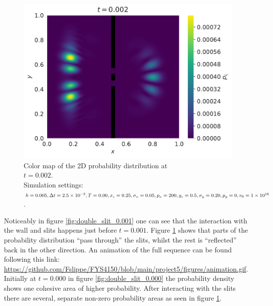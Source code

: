 \documentclass[english,notitlepage,reprint,nofootinbib]{revtex4-1}  %
\begin{document}
\begin{figure}[H]
    \centering
    \includegraphics[width=.5\textwidth]{../figures/double_slit_0.002.pdf}
    \caption{Color map of the 2D probability distribution at \\$t = 0.002$. \\Simulation settings: $h = 0.005, \Delta t = 2.5 \times 10^{-5}, \\T = 0.00, x_c = 0.25, \sigma_x = 0.05, p_x = 200, y_c = 0.5, \\\sigma_y = 0.20, p_y = 0, v_0 = 1 \times 10^{10}$.}
    \label{fig:double_slit_0.002}
\end{figure}
Noticeably in figure \ref{fig:double_slit_0.001} one can see that the interaction with the  wall and slits happens just before $t=0.001$. Figure \ref{fig:double_slit_0.002} shows that parts of the probability distribution ``pass through'' the slits, whilst the rest is ``reflected'' back in the other direction. An animation of the full sequence can be found following this link: \url{https://github.com/Fslippe/FYS4150/blob/main/project5/figures/animation.gif}. Initially at $t=0.000$ in figure \ref{fig:double_slit_0.000} the probability density shows one cohesive area of higher probability. After interacting with the slits there are several, separate non-zero probability areas as seen in figure \ref{fig:double_slit_0.002}.
\end{document}
